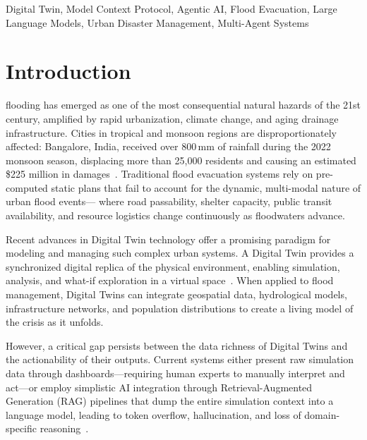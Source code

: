 \documentclass[journal]{IEEEtran}
\begin{document}
\begin{IEEEkeywords}
Digital Twin, Model Context Protocol, Agentic AI, Flood Evacuation,
Large Language Models, Urban Disaster Management, Multi-Agent Systems
\end{IEEEkeywords}

\section{Introduction}
\label{sec:introduction}

 flooding has emerged as one of the most consequential
natural hazards of the 21st century, amplified by rapid urbanization, climate
change, and aging drainage infrastructure. Cities in tropical and monsoon
regions are disproportionately affected: Bangalore, India, received over
800\,mm of rainfall during the 2022 monsoon season, displacing more than
25,000 residents and causing an estimated \$225 million in damages~\cite{ndma2022}.
Traditional flood evacuation systems rely on pre-computed static plans that
fail to account for the dynamic, multi-modal nature of urban flood events---
where road passability, shelter capacity, public transit availability, and
resource logistics change continuously as floodwaters advance.

Recent advances in Digital Twin technology offer a promising paradigm for
modeling and managing such complex urban systems. A Digital Twin provides a
synchronized digital replica of the physical environment, enabling simulation,
analysis, and what-if exploration in a virtual space~\cite{grieves2014digital,
tao2019digital}. When applied to flood management, Digital Twins can
integrate geospatial data, hydrological models, infrastructure networks, and
population distributions to create a living model of the crisis as it unfolds.

However, a critical gap persists between the data richness of Digital Twins
and the actionability of their outputs. Current systems either present raw
simulation data through dashboards---requiring human experts to manually
interpret and act---or employ simplistic AI integration through
Retrieval-Augmented Generation (RAG) pipelines that dump the entire simulation
context into a language model, leading to token overflow, hallucination, and
loss of domain-specific reasoning~\cite{lewis2020rag}.
\end{document}
